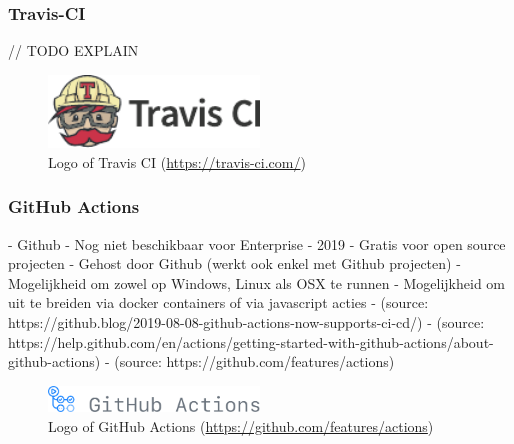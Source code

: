 \subsubsection{Travis-CI}
// TODO EXPLAIN

\begin{figure}[htbp!]
	\centering
	\includegraphics[width=0.5\textwidth]{assets/travis-ci.pdf}
	\caption{Logo of Travis CI (\url{https://travis-ci.com/})}
	\label{fig:travis-ci}
\end{figure}


\subsubsection{GitHub Actions}
- Github
- Nog niet beschikbaar voor Enterprise
- 2019
- Gratis voor open source projecten
- Gehost door Github (werkt ook enkel met Github projecten)
- Mogelijkheid om zowel op Windows, Linux als OSX te runnen
- Mogelijkheid om uit te breiden via docker containers of via javascript acties
- (source: https://github.blog/2019-08-08-github-actions-now-supports-ci-cd/)
- (source: https://help.github.com/en/actions/getting-started-with-github-actions/about-github-actions)
- (source: https://github.com/features/actions)

\begin{figure}[htbp!]
	\centering
	\includegraphics[width=0.5\textwidth]{assets/github-actions.pdf}
	\caption{Logo of GitHub Actions (\url{https://github.com/features/actions})}
	\label{fig:github-actions}
\end{figure}